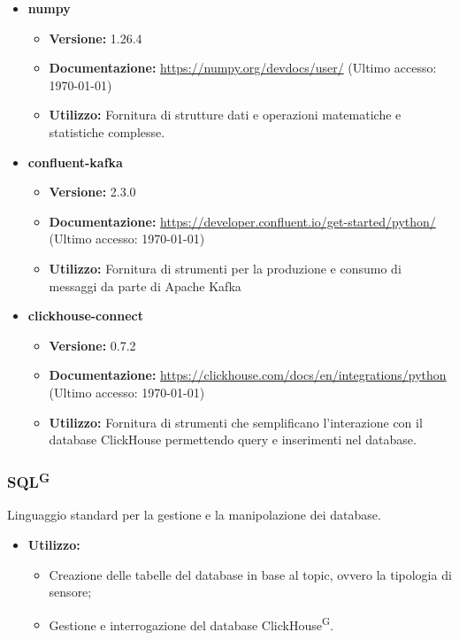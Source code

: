 \documentclass[8pt]{article}
\newcommand{\glossterm}[1]{#1\textsuperscript{G}} %
\begin{document}
\begin{itemize}
\begin{itemize}
\begin{itemize}
        \end{itemize}
        \item \textbf{numpy}
        \begin{itemize}
            \item \textbf{Versione:} 1.26.4
            \item \textbf{Documentazione:} \href{https://numpy.org/devdocs/user/}{\color{myblue}https://numpy.org/devdocs/user/} (Ultimo accesso: \today)
            \item \textbf{Utilizzo:} Fornitura di strutture dati e operazioni matematiche e statistiche complesse.
        \end{itemize}
        \item \textbf{confluent-kafka}
        \begin{itemize}
            \item \textbf{Versione:} 2.3.0
            \item \textbf{Documentazione:} \href{https://developer.confluent.io/get-started/python/}{\color{myblue}https://developer.confluent.io/get-started/python/} (Ultimo accesso: \today)
            \item \textbf{Utilizzo:} Fornitura di strumenti per la produzione e consumo di messaggi da parte di Apache Kafka
        \end{itemize}
        \item \textbf{clickhouse-connect}
        \begin{itemize}
            \item \textbf{Versione:} 0.7.2
            \item \textbf{Documentazione:} \href{https://clickhouse.com/docs/en/integrations/python}{\color{myblue}https://clickhouse.com/docs/en/integrations/python} (Ultimo accesso: \today)
            \item \textbf{Utilizzo:} Fornitura di strumenti che semplificano l'interazione con il database ClickHouse permettendo query e inserimenti nel database.
        \end{itemize}
    \end{itemize}
\end{itemize}
\subsubsection{\glossterm{SQL}}
Linguaggio standard per la gestione e la manipolazione dei database.
\begin{itemize}
    \item \textbf{Utilizzo:}
    \begin{itemize}
        \item Creazione delle tabelle del database in base al topic, ovvero la tipologia di sensore;
        \item Gestione e interrogazione del database \glossterm{ClickHouse}.
    \end{itemize}
\end{itemize}
\end{document}
